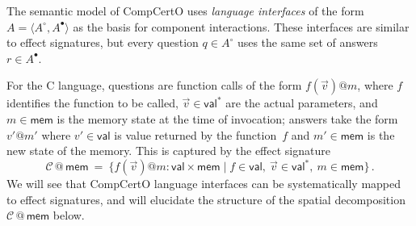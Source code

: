 \documentclass[acmsmall,screen,review,nonacm]{acmart}
\newcommand{\kw}[1]{\ensuremath{ \mathsf{#1} }}
\begin{document}
\begin{example} \label{ex:compcertosig} %
The semantic model of CompCertO uses \emph{language interfaces}
of the form $A = \langle A^\circ, A^\bullet \rangle$
as the basis for component interactions.
These interfaces are similar to effect signatures,
but every question $q \in A^\circ$ uses the same set of answers $r \in A^\bullet$.

For the C language,
questions are function calls of the form $f(\vec{v})@m$, where
$f$ identifies the function to be called,
$\vec{v} \in \kw{val}^*$ are the actual parameters, and
$m \in \kw{mem}$ is the memory state at the time of invocation;
answers take the form $v'@m'$ where
$v' \in \kw{val}$ is value returned by the function~$f$ and
$m' \in \kw{mem}$ is the new state of the memory.
This is captured by the effect signature
\[
  \mathcal{C} \mathbin@ \kw{mem} \:=\:
  \{ f(\vec{v})@m \mathbin: \kw{val} \times \kw{mem} \mid
     f \in \kw{val}, \:
     \vec{v} \in \kw{val}^*, \:
     m \in \kw{mem} \}
  \,.
\]
We will see that CompCertO language interfaces
can be systematically mapped to effect signatures,
and will elucidate the structure of
the spatial decomposition $\mathcal{C} \mathbin@ \kw{mem}$ below.
\end{example}

\end{document}
